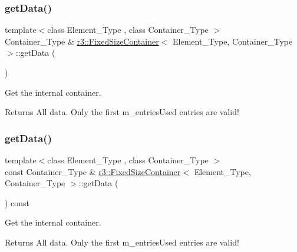 \subsubsection{\texorpdfstring{get\+Data()}{getData()}\hspace{0.1cm}{\footnotesize\ttfamily [1/2]}}
{\footnotesize\ttfamily template$<$class Element\+\_\+\+Type , class Container\+\_\+\+Type $>$ \\
Container\+\_\+\+Type \& \mbox{\hyperlink{classr3_1_1_fixed_size_container}{r3\+::\+Fixed\+Size\+Container}}$<$ Element\+\_\+\+Type, Container\+\_\+\+Type $>$\+::get\+Data (\begin{DoxyParamCaption}{ }\end{DoxyParamCaption})}



Get the internal container. 

\begin{DoxyReturn}{Returns}
All data. Only the first m\+\_\+entries\+Used entries are valid! 
\end{DoxyReturn}
\mbox{\label{classr3_1_1_fixed_size_container_acd837bc4730c98aa4346819726620842}} 
\subsubsection{\texorpdfstring{get\+Data()}{getData()}\hspace{0.1cm}{\footnotesize\ttfamily [2/2]}}
{\footnotesize\ttfamily template$<$class Element\+\_\+\+Type , class Container\+\_\+\+Type $>$ \\
const Container\+\_\+\+Type \& \mbox{\hyperlink{classr3_1_1_fixed_size_container}{r3\+::\+Fixed\+Size\+Container}}$<$ Element\+\_\+\+Type, Container\+\_\+\+Type $>$\+::get\+Data (\begin{DoxyParamCaption}{ }\end{DoxyParamCaption}) const}



Get the internal container. 

\begin{DoxyReturn}{Returns}
All data. Only the first m\+\_\+entries\+Used entries are valid! 
\end{DoxyReturn}
\mbox{\label{classr3_1_1_fixed_size_container_a5d21f93fcf7117df372d321c0d9102fa}} 
